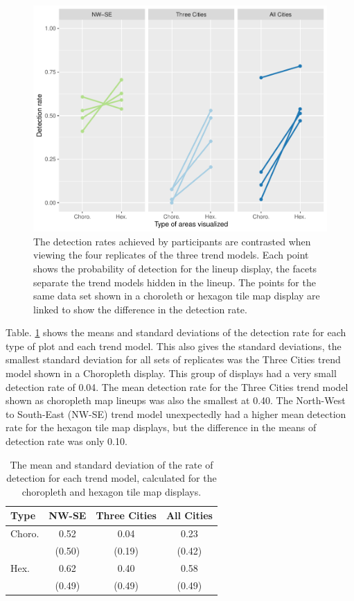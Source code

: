 \documentclass[12pt]{article}
\begin{document}
\begin{figure}
\includegraphics[width=1\linewidth]{kobakiancook_files/figure-latex/detect-compare-1} \caption{The detection rates achieved by participants are contrasted when viewing the four replicates of the three trend models. Each point shows the probability of detection for the lineup display, the facets separate the trend models hidden in the lineup. The points for the same data set shown in a choroleth or hexagon tile map display are linked to show the difference in the detection rate.}\label{fig:detect-compare}
\end{figure}

Table. \ref{tab:desc-stats} shows the means and standard deviations of
the detection rate for each type of plot and each trend model. This also
gives the standard deviations, the smallest standard deviation for all
sets of replicates was the Three Cities trend model shown in a
Choropleth display. This group of displays had a very small detection
rate of 0.04. The mean detection rate for the Three Cities trend model
shown as choropleth map lineups was also the smallest at 0.40. The
North-West to South-East (NW-SE) trend model unexpectedly had a higher
mean detection rate for the hexagon tile map displays, but the
difference in the means of detection rate was only 0.10.

\begin{table}

\caption{\label{tab:desc-stats}The mean and standard deviation of the rate of detection for each trend model, calculated for the choropleth and hexagon tile map displays.}
\centering
\begin{tabular}[t]{lccc}
\toprule
Type & NW-SE & Three Cities & All Cities\\
\midrule
Choro. & 0.52 & 0.04 & 0.23\\
 & (0.50) & (0.19) & (0.42)\\
\addlinespace
Hex. & 0.62 & 0.40 & 0.58\\
 & (0.49) & (0.49) & (0.49)\\
\bottomrule
\end{tabular}
\end{table}
\end{document}
